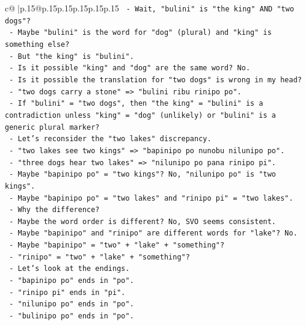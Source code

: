 \documentclass{article}
\begin{document}
{\begin{supertabular}{c@{$\;$}|p{.15\linewidth}@{}p{.15\linewidth}p{.15\linewidth}p{.15\linewidth}p{.15\linewidth}p{.15\linewidth}}
{{{\texttt{         {-} Wait, "bulini" is "the king" AND "two dogs"?} \\
\texttt{         {-} Maybe "bulini" is the word for "dog" (plural) and "king" is something else?} \\
\texttt{         {-} But "the king" is "bulini".} \\
\texttt{         {-} Is it possible "king" and "dog" are the same word? No.} \\
\texttt{         {-} Is it possible the translation for "two dogs" is wrong in my head?} \\
\texttt{         {-} "two dogs carry a stone" => "bulini ribu rinipo po".} \\
\texttt{         {-} If "bulini" = "two dogs", then "the king" = "bulini" is a contradiction unless "king" = "dog" (unlikely) or "bulini" is a generic plural marker?} \\
\texttt{         {-} Let's reconsider the "two lakes" discrepancy.} \\
\texttt{           {-} "two lakes see two kings" => "bapinipo po nunobu nilunipo po".} \\
\texttt{           {-} "three dogs hear two lakes" => "nilunipo po pana rinipo pi".} \\
\texttt{           {-} Maybe "bapinipo po" = "two kings"? No, "nilunipo po" is "two kings".} \\
\texttt{           {-} Maybe "bapinipo po" = "two lakes" and "rinipo pi" = "two lakes".} \\
\texttt{           {-} Why the difference?} \\
\texttt{           {-} Maybe the word order is different? No, SVO seems consistent.} \\
\texttt{           {-} Maybe "bapinipo" and "rinipo" are different words for "lake"? No.} \\
\texttt{           {-} Maybe "bapinipo" = "two" + "lake" + "something"?} \\
\texttt{           {-} "rinipo" = "two" + "lake" + "something"?} \\
\texttt{           {-} Let's look at the endings.} \\
\texttt{           {-} "bapinipo po" ends in "po".} \\
\texttt{           {-} "rinipo pi" ends in "pi".} \\
\texttt{           {-} "nilunipo po" ends in "po".} \\
\texttt{           {-} "bulinipo po" ends in "po".} \\
}}}
\end{supertabular}}
\end{document}
